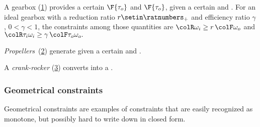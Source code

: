 
\begin{example}
    A gearbox (\cref{fig:gearbox}) provides a certain  $\F{\tau_o}$ and  $\F{\tau_o}$, given a certain
     and .
    For an ideal gearbox with a reduction ratio $r \setin \ratnumbers_+$ and efficiency ratio $\gamma$, $0<\gamma<1$, the constraints among those quantities are ${\colR \omega_i}\geq r\,{\colF \omega_o}$
    and ${\colR \tau_i\omega_i}\geq\gamma\,{\colF \tau_o\omega_o}.
    $
\end{example}
\begin{figure}[h]
    \centering
    \caption{}
    \label{fig:gearbox}
\end{figure}

\begin{example}
    \emph{Propellers}~(\cref{fig:propeller}) generate 
    given a certain  and .
\end{example}
\begin{figure}[h]
    \centering
    \caption{}
    \label{fig:propeller}
\end{figure}

\begin{example}
    A \emph{crank-rocker} (\cref{fig:crack}) converts  into a .
\end{example}
\begin{figure}[h]
    \centering
    \caption{}
    \label{fig:crack}
\end{figure}

\subsubsection{Geometrical constraints}

Geometrical constraints are examples of constraints that are easily recognized as monotone, but possibly hard to write down in closed form.

